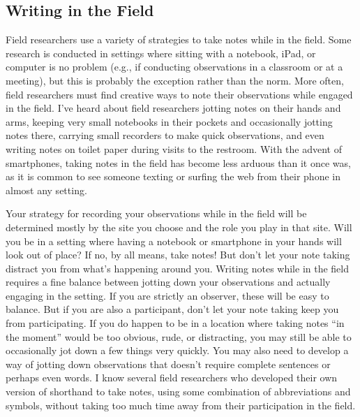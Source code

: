 \subsection{Writing in the Field}

Field researchers use a variety of strategies to take notes while in the field. Some research is conducted in settings where sitting with a notebook, iPad, or computer is no problem (e.g., if conducting observations in a classroom or at a meeting), but this is probably the exception rather than the norm. More often, field researchers must find creative ways to note their observations while engaged in the field. I’ve heard about field researchers jotting notes on their hands and arms, keeping very small notebooks in their pockets and occasionally jotting notes there, carrying small recorders to make quick observations, and even writing notes on toilet paper during visits to the restroom. With the advent of smartphones, taking notes in the field has become less arduous than it once was, as it is common to see someone texting or surfing the web from their phone in almost any setting.

Your strategy for recording your observations while in the field will be determined mostly by the site you choose and the role you play in that site. Will you be in a setting where having a notebook or smartphone in your hands will look out of place? If no, by all means, take notes! But don’t let your note taking distract you from what’s happening around you. Writing notes while in the field requires a fine balance between jotting down your observations and actually engaging in the setting. If you are strictly an observer, these will be easy to balance. But if you are also a participant, don’t let your note taking keep you from participating. If you do happen to be in a location where taking notes ``in the moment'' would be too obvious, rude, or distracting, you may still be able to occasionally jot down a few things very quickly. You may also need to develop a way of jotting down observations that doesn’t require complete sentences or perhaps even words. I know several field researchers who developed their own version of shorthand to take notes, using some combination of abbreviations and symbols, without taking too much time away from their participation in the field.

